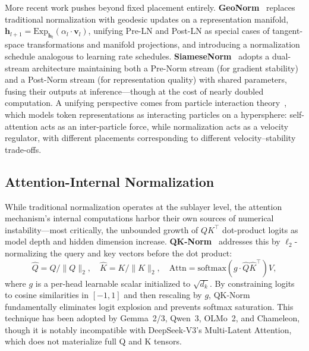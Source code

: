 More recent work pushes beyond fixed placement entirely.
\textbf{GeoNorm}~\cite{li2026geonorm} replaces traditional normalization with geodesic updates on a representation manifold, $\mathbf{h}_{l+1} = \text{Exp}_{\mathbf{h}_l}(\alpha_l \cdot \mathbf{v}_l)$, unifying Pre-LN and Post-LN as special cases of tangent-space transformations and manifold projections, and introducing a normalization schedule analogous to learning rate schedules.
\textbf{SiameseNorm}~\cite{wang2025siamesenorm} adopts a dual-stream architecture maintaining both a Pre-Norm stream (for gradient stability) and a Post-Norm stream (for representation quality) with shared parameters, fusing their outputs at inference---though at the cost of nearly doubled computation.
A unifying perspective comes from particle interaction theory~\cite{karagodin2025normalization}, which models token representations as interacting particles on a hypersphere: self-attention acts as an inter-particle force, while normalization acts as a velocity regulator, with different placements corresponding to different velocity--stability trade-offs.

\subsection{Attention-Internal Normalization}

While traditional normalization operates at the sublayer level, the attention mechanism's internal computations harbor their own sources of numerical instability---most critically, the unbounded growth of $QK^\top$ dot-product logits as model depth and hidden dimension increase.
\textbf{QK-Norm}~\cite{henry2020query} addresses this by $\ell_2$-normalizing the query and key vectors before the dot product:
\begin{equation}
    \hat{Q} = Q / \|Q\|_2, \quad \hat{K} = K / \|K\|_2, \quad \text{Attn} = \text{softmax}\!\left(g \cdot \hat{Q}\hat{K}^\top\right) V,
\end{equation}
where $g$ is a per-head learnable scalar initialized to $\sqrt{d_k}$.
By constraining logits to cosine similarities in $[-1, 1]$ and then rescaling by $g$, QK-Norm fundamentally eliminates logit explosion and prevents softmax saturation.
This technique has been adopted by Gemma~2/3, Qwen~3, OLMo~2, and Chameleon, though it is notably incompatible with DeepSeek-V3's Multi-Latent Attention, which does not materialize full Q and K tensors.


